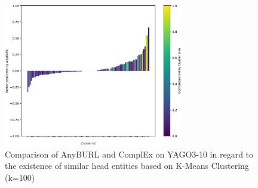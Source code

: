 \begin{figure}[H]
\centering
\includegraphics[width=0.7\textwidth]{images/head_cluster_100_anyburl_complex_yago.PNG}
\caption{Comparison of AnyBURL and ComplEx on YAGO3-10 in regard to the existence of similar head entities based on K-Means Clustering (k=100)}
\label{fig:head_cluster_100_anyburl_complex_yago}
\end{figure}
